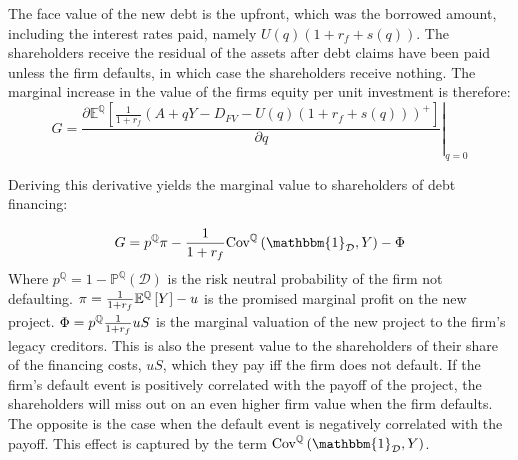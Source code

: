 \documentclass[../main.tex]{subfiles}
\begin{document}
        The face value of the new debt is the upfront, which was the borrowed amount, 
        including the interest rates paid, namely 
        $U(q)(1 + r_{f} + s(q))$. 
        The shareholders receive the residual of the assets after debt claims have been paid
        unless the firm defaults, in which case the shareholders receive nothing. 
        The marginal increase in the value of the firms equity per unit investment is therefore:
            \begin{equation}
                G = 
                \left.
                \frac{
                    \partial 
                    \mathbb{E}^{\mathbb{Q}}\left[
                        \frac{1}{1+r_{f}} 
                        \left(
                            A + qY - D_{FV} - U(q)(1 + r_{f} + s(q))
                        \right)^{+}
                    \right] 
                }{
                    \partial 
                    q
                }
                \right\rvert_{q=0} 
            \end{equation}
        

        Deriving this derivative yields the marginal value to shareholders of debt financing:

            \begin{equation}
                G = 
                    p^{\mathbb{Q}}\pi 
                    - \discountfactor  \text{Cov}^{\mathbb{Q}}\left(\mathbbm{1}_{\mathcal{D}}, Y\right) - \Phi
                    \label{eqn:marginal-shareholder-value-debt-financing}
            \end{equation}
        Where $p^{\mathbb{Q}} = 1 - \mathbb{P}^{\mathbb{Q}}\left(\mathcal{D}\right)$ is the risk neutral probability of the firm not defaulting. 
        $\pi = \frac{1}{1 + r_{f}} \mathbb{E}^{\mathbb{Q}}\left[Y\right] - u$ 
        is the promised marginal profit on the new project. 
        $\Phi = p^{\mathbb{Q}} \frac{1}{1 + r_{f}} u S$
        is the marginal valuation of the new project to the firm's legacy creditors. 
        This is also the present value to the shareholders of their share of the financing costs, $uS$,
        which they pay iff the firm does not default. 
        If the firm's default event is positively correlated with the payoff of the project,
        the shareholders will miss out on an even higher firm value when the firm defaults.
        The opposite is the case when the default event is negatively correlated with the payoff.
        This effect is captured by the term 
        $\text{Cov}^{\mathbb{Q}}\left(\mathbbm{1}_{\mathcal{D}}, Y\right)$.
\end{document}
